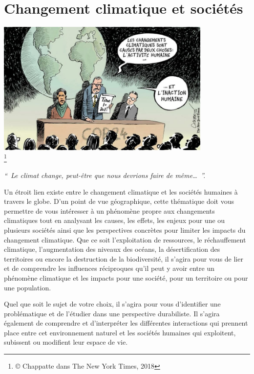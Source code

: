 \documentclass[
  10pt,
  french,
  a5paper,
  openany]{book}
\begin{document}
\hypertarget{changement-climatique-et-sociuxe9tuxe9s}{%
\chapter{Changement climatique et sociétés}\label{changement-climatique-et-sociuxe9tuxe9s}}

\begin{center}
\includegraphics[width=\textwidth,height=18em]{images/changement-climatique-et-societes.jpg}\\
\footnote{© Chappatte dans The New York Times, 2018}

\end{center}


\emph{``~Le climat change, peut-être que nous devrions faire de même\ldots~''.}


Un étroit lien existe entre le changement climatique et les sociétés humaines à travers le globe. D'un point de vue géographique, cette thématique doit vous permettre de vous intéresser à un phénomène propre aux changements climatiques tout en analysant les causes, les effets, les enjeux pour une ou plusieurs sociétés ainsi que les perspectives concrètes pour limiter les impacts du changement climatique. Que ce soit l'exploitation de ressources, le réchauffement climatique, l'augmentation des niveaux des océans, la désertification des territoires ou encore la destruction de la biodiversité, il s'agira pour vous de lier et de comprendre les influences réciproques qu'il peut y avoir entre un phénomène climatique et les impacts pour une société, pour un territoire ou pour une population.

\clearpage

Quel que soit le sujet de votre choix, il s'agira pour vous d'identifier une problématique et de l'étudier dans une perspective durabiliste. Il s'agira également de comprendre et d'interpréter les différentes interactions qui prennent place entre cet environnement naturel et les sociétés humaines qui exploitent, subissent ou modifient leur espace de vie.
\end{document}
